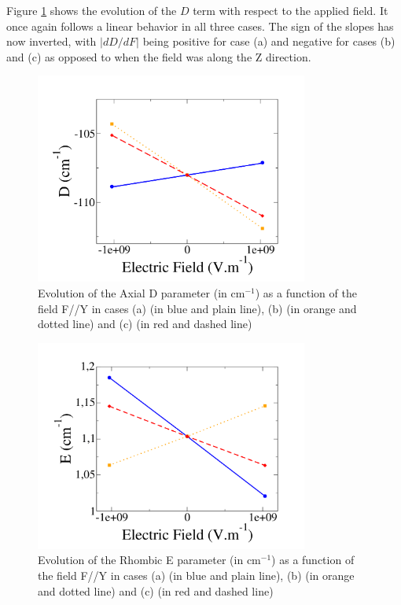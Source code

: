 \documentclass[12pt]{report}
\numberwithin{equation}{section}
\begin{document}
Figure \ref{fig:Ni_D_Y} shows the evolution of the $D$ term with respect to the applied field. It once again follows a linear behavior in all three cases.
The sign of the slopes has now inverted, with $|dD/dF|$ being positive for case (a) and negative for cases (b) and (c) as opposed to when the field was along the Z direction.


\begin{figure}[!ht]
    \centering
    \includegraphics[width=0.8\textwidth]{Images/D_E_Y.png}
    \caption{Evolution of the Axial D parameter (in cm$^{-1}$) as a function of the field F//Y in cases (a) (in blue and plain line), (b) (in orange and dotted line) and (c) (in red and dashed line)}
    \label{fig:Ni_D_Y}
\end{figure}

\begin{figure}[!ht]
    \centering
    \includegraphics[width=0.8\textwidth]{Images/E_E_Y.png}
    \caption{Evolution of the Rhombic E parameter (in cm$^{-1}$) as a function of the field F//Y in cases (a) (in blue and plain line), (b) (in orange and dotted line) and (c) (in red and dashed line)}
    \label{fig:Ni_E_Y}
\end{figure}
\end{document}
